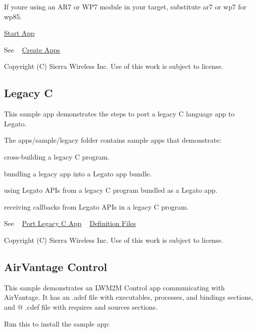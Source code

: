 If you\textquotesingle{}re using an A\+R7 or W\+P7 module in your target, substitute {\ttfamily ar7} or {\ttfamily wp7} for {\ttfamily wp85}.

\hyperlink{sample_apps_sampleApps_startApp}{Start App}





See ~\newline
 \hyperlink{basicAppsCreate}{Create Apps}





Copyright (C) Sierra Wireless Inc. Use of this work is subject to license. \hypertarget{sampleApps_legacy}{}\subsection{Legacy C}\label{sampleApps_legacy}
This sample app demonstrates the steps to port a legacy C language app to Legato.

The {\ttfamily apps/sample/legacy} folder contains sample apps that demonstrate\+:
\begin{DoxyItemize}
\item cross-\/building a legacy C program.
\item bundling a legacy app into a Legato app bundle.
\item using Legato A\+P\+Is from a legacy C program bundled as a Legato app.
\item receiving callbacks from Legato A\+P\+Is in a legacy C program.
\end{DoxyItemize}

See ~\newline
 \hyperlink{howToPortLegacyC}{Port Legacy C App} ~\newline
 \hyperlink{defFiles}{Definition Files}





Copyright (C) Sierra Wireless Inc. Use of this work is subject to license. \hypertarget{sampleApps_AV}{}\subsection{Air\+Vantage Control}\label{sampleApps_AV}
This sample demonstrates an L\+W\+M2\+M Control app communicating with Air\+Vantage. It has an {\ttfamily }.adef file with executables, processes, and bindings sections, and @ .cdef file with requires and sources sections.

Run this to install the sample app\+: 


